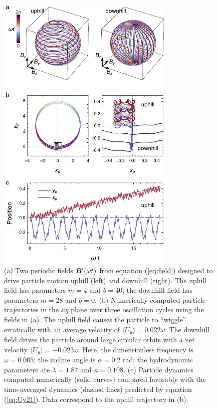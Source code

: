 \begin{figure}[h!]
    \centering
    \includegraphics[width=8.5cm]{figures/5ModelDriven.pdf}
    \caption{(a) Two periodic fields $\boldsymbol{B}'(\omega t)$ from equation (\ref{eq:field}) designed to drive particle motion uphill (left) and downhill (right).  The uphill field has parameters $m=4$ and $b=40$; the downhill field has parameters $m=28$ and $b=0$. (b) Numerically computed particle trajectories in the $xy$ plane over three oscillation cycles using the fields in (a). The uphill field causes the particle to ``wiggle'' erratically with an average velocity of $\langle U_y\rangle = 0.022\omega$. The downhill field drives the particle around large circular orbits with a net velocity $\langle U_y\rangle = -0.023\omega$. Here, the dimensionless frequency is $\omega=0.005$; the incline angle is $\alpha=0.2$ rad; the hydrodynamic parameters are $\lambda=1.87$ and $\kappa=0.108$. (c) Particle dynamics  computed numerically (solid curves) compared favorably with the time-averaged dynamics (dashed lines) predicted by equation (\ref{eq:Uy21}). Data correspond to the uphill trajectory in (b).}
    \label{fig:ModelDriven}
\end{figure}

